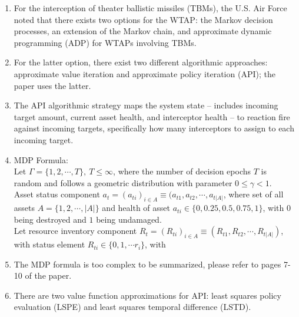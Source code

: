 \documentclass[12pt]{article} %
\renewcommand\le{\leqslant}
\begin{document}
\begin{enumerate}
    \item For the interception of theater ballistic missiles (TBMs), the U.S. Air Force noted that there exists two options for the WTAP: the Markov decision processes, an extension of the Markov chain, and approximate dynamic programming (ADP) for WTAPs involving TBMs.
    \item For the latter option, there exist two different algorithmic approaches: approximate value iteration and approximate policy iteration (API); the paper uses the latter.
    \item The API algorithmic strategy maps the system state -- includes incoming target amount, current asset health, and interceptor health -- to reaction fire against incoming targets, specifically how many interceptors to assign to each incoming target.
    \item MDP Formula:\\
    Let $\Gamma = \{1, 2, \cdots, T\},\ T \le \infty$, where the number of decision epochs $T$ is random and follows a geometric distribution with parameter $0 \le \gamma < 1$. \\Asset status component $a_t = (a_{ti})_{i\in A}\equiv (a_{t1}, a_{t2}, \cdots, a_{t|A|}$, where set of all assets $A = \{1, 2, \cdots, |A|\}$ and health of asset $a_{ti} \in \{0, 0.25, 0.5, 0.75, 1\}$, with $0$ being destroyed and $1$ being undamaged. \\
    Let resource inventory component $R_t = (R_{ti})_{i\in A} \equiv (R_{t1}, R_{t2}, \cdots, R_{t|A|})$, with status element $R_{ti} \in \{0,1,\cdots r_i\}$, with
    \item The MDP formula is too complex to be summarized, please refer to pages 7-10 of the paper.
    \item There are two value function approximations for API: least squares policy evaluation (LSPE) and least squares temporal difference (LSTD).\\
    \vspace{-0.25cm}

\end{enumerate}
\end{document}
